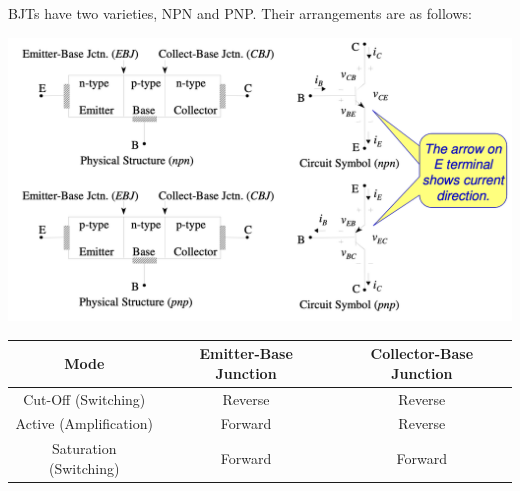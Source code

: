 \documentclass{article}
\begin{document}
    BJTs have two varieties, NPN and PNP. Their arrangements are as follows:

    \begin{center}
      \includegraphics[width=\textwidth]{images/bjt.png}
    \end{center}


    
    \begin{tabular}{|c|c|c|}
      \hline
      Mode & Emitter-Base Junction & Collector-Base Junction \\
      \hline
      Cut-Off (Switching) & Reverse & Reverse \\
      \hline
      Active (Amplification) & Forward & Reverse \\
      \hline
      Saturation (Switching) & Forward & Forward \\
      \hline
    \end{tabular}

    
\end{document}
